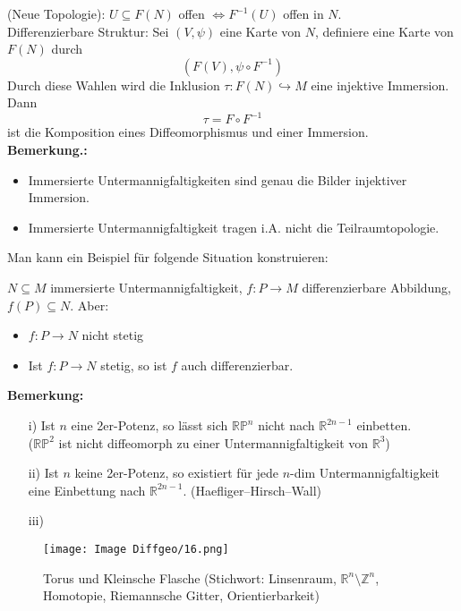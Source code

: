 \documentclass[fleqn, 12pt, letterpaper]{article}
\begin{document}
(Neue Topologie): \( U \subseteq F(N)   \) offen \( \Leftrightarrow F^{-1}(U) \) offen in \( N \).\\

Differenzierbare Struktur: Sei \( (V, \psi) \) eine Karte von \( N \), definiere eine Karte von \( F(N) \) durch
\[ (F(V), \psi \circ F^{-1}) \]
Durch diese Wahlen wird die Inklusion \( \tau : F(N) \hookrightarrow M \) eine injektive Immersion. Dann
\[\tau = F \circ F^{-1} \]
ist die Komposition eines Diffeomorphismus und einer Immersion.\\

\textbf{{Bemerkung.:}}
\begin{itemize}
\item Immersierte Untermannigfaltigkeiten sind genau die Bilder injektiver Immersion.
\item Immersierte Untermannigfaltigkeit tragen i.A. nicht die Teilraumtopologie.
\end{itemize}

Man kann ein Beispiel für folgende Situation konstruieren:

\( N \subseteq M \) immersierte Untermannigfaltigkeit, \( f : P \to M \) differenzierbare Abbildung, \( f(P) \subseteq N \). Aber:
\begin{itemize}
\item \( f : P \to N \) nicht stetig
\item Ist \( f : P \to N \) stetig, so ist \( f \) auch differenzierbar.
\end{itemize}

\textbf{Bemerkung:}
\begin{enumerate}
\item[i)] Ist \( n \) eine 2er-Potenz, so lässt sich \( \mathbb{RP}^n \) nicht nach \( \mathbb{R}^{2n-1} \) einbetten.\\
(\( \mathbb{RP}^2 \) ist nicht diffeomorph zu einer Untermannigfaltigkeit von \( \mathbb{R}^3 \))

\item[ii)] Ist \( n \) keine 2er-Potenz, so existiert für jede \( n \)-dim Untermannigfaltigkeit eine Einbettung nach \( \mathbb{R}^{2n-1} \). (Haefliger–Hirsch–Wall)

\item[iii)] 
\end{enumerate}

\begin{figure}[H]
  \centering
  \texttt{[image: Image Diffgeo/16.png]}
\caption{Torus und Kleinsche Flasche (Stichwort: Linsenraum, $\mathbb{R}^n\setminus \mathbb{Z}^n$, Homotopie, Riemannsche Gitter, Orientierbarkeit)}
\end{figure}
\end{document}

